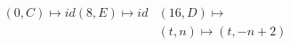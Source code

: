 \documentclass[preview]{standalone}
\begin{document}
\begin{align*}
(0,C) \mapsto id (8,E) \mapsto id &(16,D) \mapsto \\& (t,n) \mapsto (t, -n + 2)
\end{align*}
\end{document}

